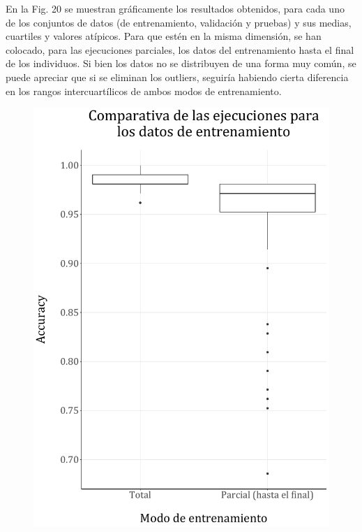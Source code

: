 \documentclass[spanish,a4paper,12pt,twoside]{report}
\begin{document}
  En la Fig. 20 se muestran gráficamente los resultados obtenidos, para cada uno de los conjuntos de datos (de entrenamiento, validación y pruebas) y sus medias, cuartiles y valores atípicos. Para que estén en la misma dimensión, se han colocado, para las ejecuciones parciales, los datos del entrenamiento hasta el final de los individuos. Si bien los datos no se distribuyen de una forma muy común, se puede apreciar que si se eliminan los outliers, seguiría habiendo cierta diferencia en los rangos intercuartílicos de ambos modos de entrenamiento.
  \begin{figure}[H]
    \begin{minipage}{0.49\textwidth}
      \centering
      \includegraphics[width = 1\linewidth]{resources/Fig20_1.pdf}
    \end{minipage}
    \begin{minipage}{0.49\textwidth}
      \centering

\end{minipage}
\end{figure}
\end{document}
